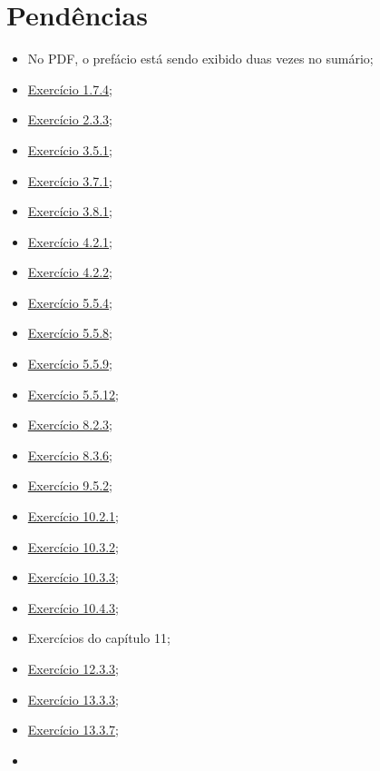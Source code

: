 \documentclass[
]{latex/krantz}
\providecommand{\tightlist}{%
  \setlength{\itemsep}{0pt}\setlength{\parskip}{0pt}}
\theoremstyle{definition}
\theoremstyle{definition}
\theoremstyle{definition}
\theoremstyle{definition}
\theoremstyle{remark}
\begin{document}
\hypertarget{penduxeancias}{%
\section*{Pendências}\label{penduxeancias}}

\begin{itemize}
\tightlist
\item
  No PDF, o prefácio está sendo exibido duas vezes no sumário;
\item
  \protect\hyperlink{exr1-7-4}{Exercício 1.7.4};
\item
  \protect\hyperlink{exr2-3-3}{Exercício 2.3.3};
\item
  \protect\hyperlink{exr3-5-1}{Exercício 3.5.1};
\item
  \protect\hyperlink{exr3-7-1}{Exercício 3.7.1};
\item
  \protect\hyperlink{exr3-8-1}{Exercício 3.8.1};
\item
  \protect\hyperlink{exr4-2-1}{Exercício 4.2.1};
\item
  \protect\hyperlink{exr4-2-2}{Exercício 4.2.2};
\item
  \protect\hyperlink{exr5-5-4}{Exercício 5.5.4};
\item
  \protect\hyperlink{exr5-5-8}{Exercício 5.5.8};
\item
  \protect\hyperlink{exr5-5-9}{Exercício 5.5.9};
\item
  \protect\hyperlink{exr5-5-12}{Exercício 5.5.12};
\item
  \protect\hyperlink{exr8-2-3}{Exercício 8.2.3};
\item
  \protect\hyperlink{exr8-3-6}{Exercício 8.3.6};
\item
  \protect\hyperlink{exr9-5-2}{Exercício 9.5.2};
\item
  \protect\hyperlink{exr10-2-1}{Exercício 10.2.1};
\item
  \protect\hyperlink{exr10-3-2}{Exercício 10.3.2};
\item
  \protect\hyperlink{exr10-3-3}{Exercício 10.3.3};
\item
  \protect\hyperlink{exr10-4-3}{Exercício 10.4.3};
\item
  Exercícios do capítulo 11;
\item
  \protect\hyperlink{exr12-3-3}{Exercício 12.3.3};
\item
  \protect\hyperlink{exr13-3-3}{Exercício 13.3.3};
\item
  \protect\hyperlink{exr13-3-7}{Exercício 13.3.7};
\item

\end{itemize}
\end{document}
